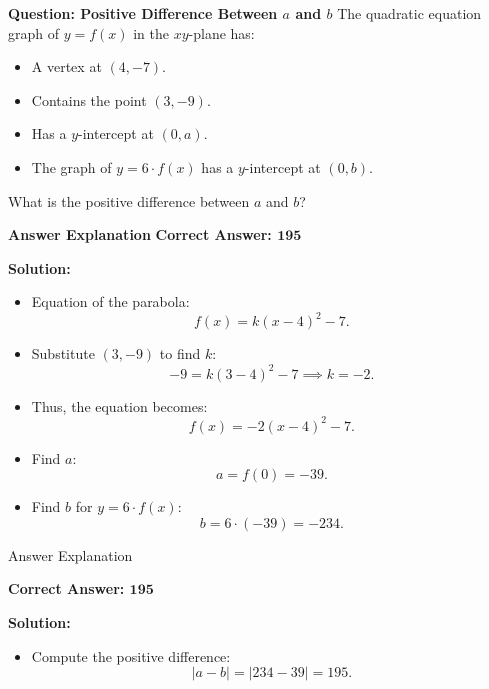 \documentclass{beamer}
\begin{document}
\vspace{1cm}

\begin{frame}{\textbf{Question: Positive Difference Between \( a \) and \( b \)}}
    The quadratic equation graph of \( y = f(x) \) in the \( xy \)-plane has:
    \begin{itemize}
        \item A vertex at \( (4, -7) \).
        \item Contains the point \( (3, -9) \).
        \item Has a \( y \)-intercept at \( (0, a) \).
        \item The graph of \( y = 6 \cdot f(x) \) has a \( y \)-intercept at \( (0, b) \).
    \end{itemize}
    What is the positive difference between \( a \) and \( b \)?
\end{frame}

\begin{frame}{\textbf{Answer Explanation}}
    \textbf{Correct Answer: \textcolor{novelPurple}{\( \mathbf{195} \)}}  

    \vspace{0.3cm}
    \textbf{Solution:}
    \begin{itemize}
        \item Equation of the parabola:
        \[
        f(x) = k(x - 4)^2 - 7.
        \]
        \item Substitute \( (3, -9) \) to find \( k \):
        \[
        -9 = k(3 - 4)^2 - 7 \implies k = -2.
        \]
        \item Thus, the equation becomes:
        \[
        f(x) = -2(x - 4)^2 - 7.
        \]
        \item Find \( a \):
        \[
        a = f(0) = -39.
        \]
        \item Find \( b \) for \( y = 6 \cdot f(x) \):
        \[
        b = 6 \cdot (-39) = -234.
        \]

    \end{itemize}
\end{frame}


\begin{frame}{Answer Explanation}

    \textbf{Correct Answer: \textcolor{novelPurple}{\( \mathbf{195} \)}}  

    \vspace{0.3cm}
    \textbf{Solution:}
 \begin{itemize}
             \item Compute the positive difference:
        \[
        |a - b| = |234 - 39| = \boxed{195}.
        \]
 \end{itemize}
    
\end{frame}
\end{document}
